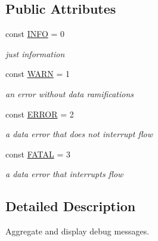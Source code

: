 \subsection*{Public Attributes}
\begin{DoxyCompactItemize}
\item 
\hypertarget{classJDebug_ab1d6744a646820f740a6239c87cdac2e}{const \hyperlink{classJDebug_ab1d6744a646820f740a6239c87cdac2e}{I\-N\-F\-O} = 0}\label{classJDebug_ab1d6744a646820f740a6239c87cdac2e}

\begin{DoxyCompactList}\small\item\em just information \end{DoxyCompactList}\item 
\hypertarget{classJDebug_a2b9e40889ea875bb6703be05e2f1113b}{const \hyperlink{classJDebug_a2b9e40889ea875bb6703be05e2f1113b}{W\-A\-R\-N} = 1}\label{classJDebug_a2b9e40889ea875bb6703be05e2f1113b}

\begin{DoxyCompactList}\small\item\em an error without data ramifications \end{DoxyCompactList}\item 
\hypertarget{classJDebug_a1b7962d9b5ceaeb5ed07fbf6cddb959d}{const \hyperlink{classJDebug_a1b7962d9b5ceaeb5ed07fbf6cddb959d}{E\-R\-R\-O\-R} = 2}\label{classJDebug_a1b7962d9b5ceaeb5ed07fbf6cddb959d}

\begin{DoxyCompactList}\small\item\em a data error that does not interrupt flow \end{DoxyCompactList}\item 
\hypertarget{classJDebug_a40229b82ac0e4ae78bc6fed84d17e02e}{const \hyperlink{classJDebug_a40229b82ac0e4ae78bc6fed84d17e02e}{F\-A\-T\-A\-L} = 3}\label{classJDebug_a40229b82ac0e4ae78bc6fed84d17e02e}

\begin{DoxyCompactList}\small\item\em a data error that interrupts flow \end{DoxyCompactList}\end{DoxyCompactItemize}


\subsection{Detailed Description}
Aggregate and display debug messages. 

